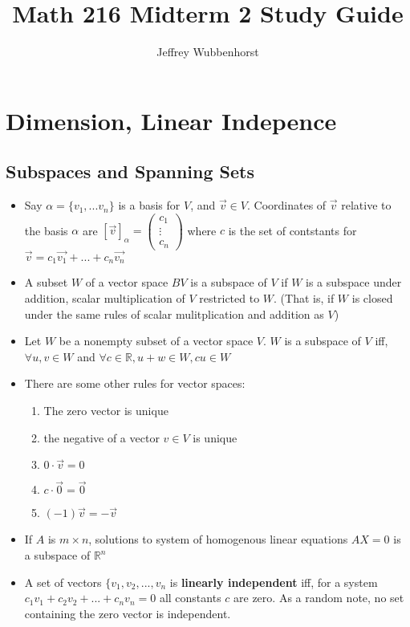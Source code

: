 \documentclass[10pt,letterpaper]{article}
\author{Jeffrey Wubbenhorst}
\title{Math 216 Midterm 2 Study Guide }
\begin{document}
\maketitle

\section*{Dimension, Linear Indepence} 
\subsection*{Subspaces and Spanning Sets }%
\begin{itemize}

\item Say $\alpha=\{v_1,...v_n\}$ is a basis for $V$, and $\vec{v}\in V$. Coordinates of $\vec{v}$ relative to the basis $\alpha$ are $[\vec{v}]_\alpha=\left(
\begin{array}{c} 
c_1 \\ \vdots \\ c_n
\end{array} \right)
$
where $c$ is the set of contstants for $\vec{v}=c_1\vec{v_1}+...+c_n\vec{v_n}$


\item A subset $W$ of a vector space $BV$ is a subspace of $V$ if $W$ is a subspace under addition, scalar multiplication of $V$ restricted to  $W$. (That is, if $W$ is closed under the same rules of scalar mulitplication and addition as $V$)

\item Let $W$ be a nonempty subset of a vector space $V$. $W$ is a subspace of $V$ iff, $\forall u, v \in W$ and $\forall c \in \mathbb{R}, u + w \in W, cu \in W$

\item There are some other rules for vector spaces: 
\begin{enumerate}
\item The zero vector is unique 
\item the negative of a vector $v\in V$ is unique 
\item $0\cdot \vec{v}=0$
\item $c\cdot \vec{0}=\vec{0}$
\item $(-1)\vec{v}=-\vec{v}$ 
\end{enumerate}
	

\item If $A$ is $m\times n$, solutions to system of homogenous linear equations $AX=0$ is a subspace of $\mathbb{R}^n$

\item A set of vectors $\{v_1, v_2, ..., v_n$ is \textbf{linearly independent }iff, for a system $c_1v_1+c_2v_2+...+c_nv_n=0$ all constants $c$ are zero. As a random note, no set containing the zero vector is independent. 

\end{itemize}	
\end{document}
